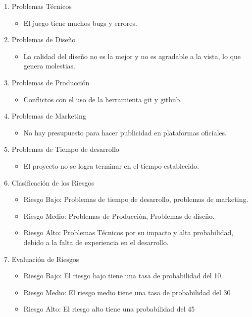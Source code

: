 \begin{enumerate}
	\item Problemas Técnicos
	      \begin{itemize}
		      \item El juego tiene muchos bugs y errores.
	      \end{itemize}

	\item Problemas de Diseño
	      \begin{itemize}
		      \item La calidad del diseño no es la mejor y no es agradable a la vista, lo que genera molestias.
	      \end{itemize}

	\item Problemas de Producción
	      \begin{itemize}
		      \item Conflictos con el uso de la herramienta git y github.
	      \end{itemize}

	\item Problemas de Marketing
	      \begin{itemize}
		      \item No hay presupuesto para hacer publicidad en plataformas oficiales.
	      \end{itemize}

	\item Problemas de Tiempo de desarrollo
	      \begin{itemize}
		      \item El proyecto no se logra terminar en el tiempo establecido.
	      \end{itemize}

	\item Clasificación de los Riesgos
	      \begin{itemize}
		      \item Riesgo Bajo: Problemas de tiempo de desarrollo, problemas de marketing.
		      \item Riesgo Medio: Problemas de Producción, Problemas de diseño.
		      \item Riesgo Alto: Problemas Técnicos por su impacto y alta probabilidad, debido a la falta de experiencia en el desarrollo.
	      \end{itemize}

	\item Evaluación de Riesgos
	      \begin{itemize}
		      \item Riesgo Bajo: El riesgo bajo tiene una tasa de probabilidad del 10%
		      \item Riesgo Medio: El riesgo medio tiene una tasa de probabilidad del 30%
		      \item Riesgo Alto: El riesgo alto tiene una probabilidad del 45%
	      \end{itemize}
\end{enumerate}

